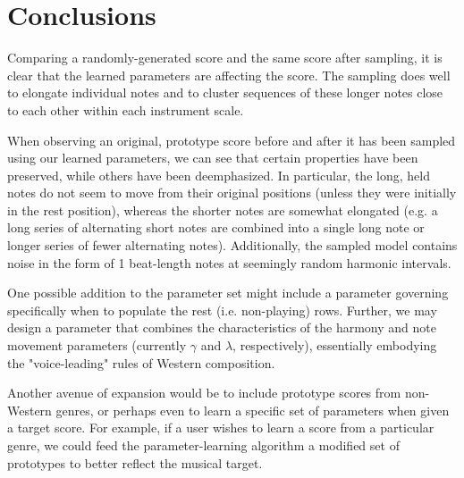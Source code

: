 \documentclass{article}
\begin{document}
\section{Conclusions}
Comparing a randomly-generated score and the same score after sampling, it is clear that the learned parameters are affecting the score.  The sampling does well to elongate individual notes and to cluster sequences of these longer notes close to each other within each instrument scale.

When observing an original, prototype score before and after it has been sampled using our learned parameters, we can see that certain properties have been preserved, while others have been deemphasized.  In particular, the long, held notes do not seem to move from their original positions (unless they were initially in the rest position), whereas the shorter notes are somewhat elongated (e.g. a long series of alternating short notes are combined into a single long note or longer series of fewer alternating notes).  Additionally, the sampled model contains noise in the form of 1 beat-length notes at seemingly random harmonic intervals.

One possible addition to the parameter set might include a parameter governing specifically when to populate the rest (i.e. non-playing) rows.  Further, we may design a parameter that combines the characteristics of the harmony and note movement parameters (currently $\gamma$ and $\lambda$, respectively), essentially embodying the "voice-leading" rules of Western composition.

Another avenue of expansion would be to include prototype scores from non-Western genres, or perhaps even to learn a specific set of parameters when given a target score.  For example, if a user wishes to learn a score from a particular genre, we could feed the parameter-learning algorithm a modified set of prototypes to better reflect the musical target.
\end{document}
